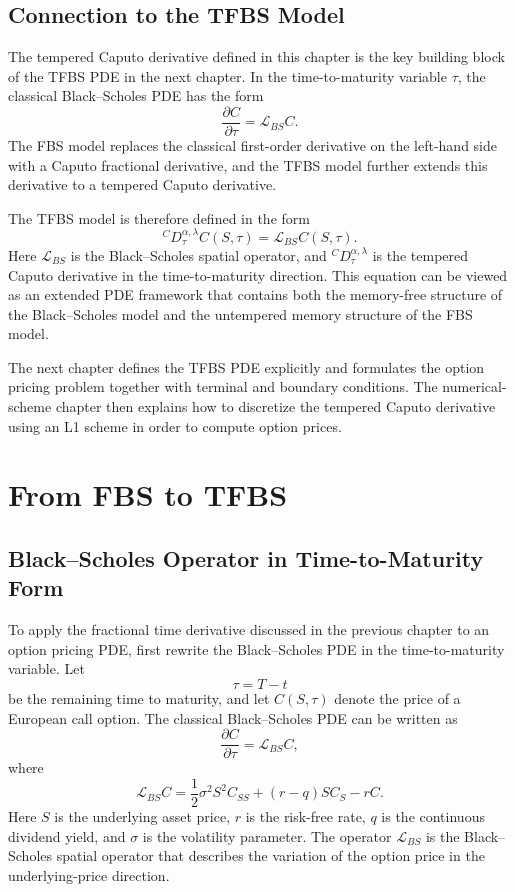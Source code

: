 \documentclass[11pt,a4paper]{report}
\begin{document}
\section{Connection to the TFBS Model}

The tempered Caputo derivative defined in this chapter is the key building block of the TFBS PDE in the next chapter. In the time-to-maturity variable $\tau$, the classical Black--Scholes PDE has the form
\[
\frac{\partial C}{\partial \tau}
=
\mathcal{L}_{BS}C.
\]
The FBS model replaces the classical first-order derivative on the left-hand side with a Caputo fractional derivative, and the TFBS model further extends this derivative to a tempered Caputo derivative.

The TFBS model is therefore defined in the form
\[
{}^C D_\tau^{\alpha,\lambda} C(S,\tau)
=
\mathcal{L}_{BS}C(S,\tau).
\]
Here $\mathcal{L}_{BS}$ is the Black--Scholes spatial operator, and ${}^C D_\tau^{\alpha,\lambda}$ is the tempered Caputo derivative in the time-to-maturity direction. This equation can be viewed as an extended PDE framework that contains both the memory-free structure of the Black--Scholes model and the untempered memory structure of the FBS model.

The next chapter defines the TFBS PDE explicitly and formulates the option pricing problem together with terminal and boundary conditions. The numerical-scheme chapter then explains how to discretize the tempered Caputo derivative using an L1 scheme in order to compute option prices.


\chapter{From FBS to TFBS}

\section{Black--Scholes Operator in Time-to-Maturity Form}

To apply the fractional time derivative discussed in the previous chapter to an option pricing PDE, first rewrite the Black--Scholes PDE in the time-to-maturity variable. Let
\[
\tau = T-t
\]
be the remaining time to maturity, and let $C(S,\tau)$ denote the price of a European call option. The classical Black--Scholes PDE can be written as
\[
\frac{\partial C}{\partial \tau}
=
\mathcal{L}_{BS}C,
\]
where
\[
\mathcal{L}_{BS}C
=
\frac{1}{2}\sigma^2S^2C_{SS}
+
(r-q)SC_S
-
rC.
\]
Here $S$ is the underlying asset price, $r$ is the risk-free rate, $q$ is the continuous dividend yield, and $\sigma$ is the volatility parameter. The operator $\mathcal{L}_{BS}$ is the Black--Scholes spatial operator that describes the variation of the option price in the underlying-price direction.
\end{document}
